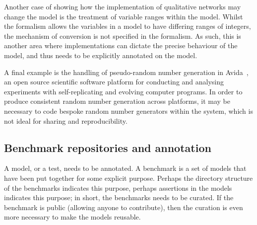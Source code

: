 \documentclass[conference]{IEEEtran}
\begin{document}
Another case of showing how the implementation of qualitative networks
may change the model is the treatment of variable ranges within the
model.  Whilst the formalism allows the variables in a model to have
differing ranges of integers, the mechanism of conversion is not
specified in the formalism. As such, this is another area where
implementations can dictate the precise behaviour of the model, and
thus needs to be explicitly annotated on the model.

A final example is the handling of pseudo-random number generation in
Avida~\cite{ofria+wilke:2004}, an open source scientific software
platform for conducting and analysing experiments with
self-replicating and evolving computer programs. In order to produce
consistent random number generation across platforms, it may be
necessary to code bespoke random number generators within the system,
which is not ideal for sharing and reproducibility.


\subsection{Benchmark repositories and annotation}


A model, or a test, needs to be annotated. A benchmark is a set of
models that have been put together for some explicit purpose. Perhaps
the directory structure of the benchmarks indicates this purpose,
perhaps assertions in the models indicates this purpose; in short, the
benchmarks needs to be curated. If the benchmark is public (allowing
anyone to contribute), then the curation is even more necessary to
make the models reusable.
\end{document}
